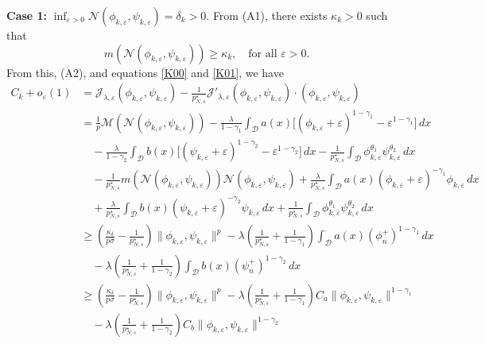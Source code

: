 \documentclass[reqno]{amsart}
\begin{document}
\noindent\textbf{Case 1:}
$\inf_{\varepsilon>0} \mathcal{N}(\phi_{k,\varepsilon},\psi_{k,\varepsilon})=\delta_k>0$.
From  (A1), there exists $\kappa_k>0$ such that
\[
m(\mathcal{N}(\phi_{k,\varepsilon},\psi_{k,\varepsilon}))\geq \kappa_k,\quad
 \text{for all } \varepsilon>0.
\]
From this, (A2), and equations \eqref{K00} and \eqref{K01}, we have
\begin{align*}
C_k+o_\varepsilon(1)
&=\mathcal{J}_{\lambda,\varepsilon}(\phi_{k,\varepsilon},\psi_{k,\varepsilon})-\frac{1}{p^\star_{N,s}}\mathcal{J}'_{\lambda,\varepsilon}(\phi_{k,\varepsilon},\psi_{k,\varepsilon})\cdot (\phi_{k,\varepsilon},\psi_{k,\varepsilon})\\
&=\frac{1}{p}\mathscr{M}(\mathcal{N}(\phi_{k,\varepsilon},\psi_{k,\varepsilon}))-\frac{\lambda}{1-\gamma_1}\int_\mathcal{D} a(x)\Big[(\phi_{k,\varepsilon}+\varepsilon)^{1-\gamma_1}-\varepsilon^{1-\gamma_1}\Big]\,dx\\
&\quad-\frac{\lambda}{1-\gamma_2}\int_\mathcal{D} b(x)\Big[(\psi_{k,\varepsilon}+\varepsilon)^{1-\gamma_2}-\varepsilon^{1-\gamma_2}\Big]\,dx-\frac{1}{p^\star_{N,s}}\int_\mathcal{D}  \phi_{k,\varepsilon}^{\theta_1}\psi_{k,\varepsilon}^{\theta_2}\,dx\\
&\quad-\frac{1}{p^\star_{N,s}}m(\mathcal{N}(\phi_{k,\varepsilon},\psi_{k,\varepsilon}))\mathcal{N}(\phi_{k,\varepsilon},\psi_{k,\varepsilon})+\frac{\lambda}{p^\star_{N,s}}\int_\mathcal{D} a(x) (\phi_{k,\varepsilon}+\varepsilon)^{-\gamma_1}\phi_{k,\varepsilon}\,dx \\
&\quad+\frac{\lambda}{p^\star_{N,s}}\int_\mathcal{D}b(x)(\psi_{k,\varepsilon}+\varepsilon)^{-\gamma_2}\psi_{k,\varepsilon}\,dx+\frac{1}{p^\star_{N,s}}\int_\mathcal{D}\phi_{k,\varepsilon}^{\theta_1}\psi_{k,\varepsilon}^{\theta_2}\,dx\\
&\geq(\frac{\kappa_\delta}{p\sigma}-\frac{1}{p^\star_{N,s}})\| \phi_{k,\varepsilon},\psi_{k,\varepsilon}\|^p-\lambda(\frac{1}{p^\star_{N,s}}+\frac{1}{1-\gamma_1})\int_\mathcal{D} a(x)(\phi_n^+)^{1-\gamma_1}\,dx\\
&\quad-\lambda(\frac{1}{p^\star_{N,s}}+\frac{1}{1-\gamma_2})\int_\mathcal{D} b(x)(\psi_n^+)^{1-\gamma_2}\,dx\\
&\geq(\frac{\kappa_\delta}{p\sigma}-\frac{1}{p^\star_{N,s}})\| \phi_{k,\varepsilon},\psi_{k,\varepsilon}\|^p-\lambda(\frac{1}{p^\star_{N,s}}+\frac{1}{1-\gamma_1})C_a \| \phi_{k,\varepsilon},\psi_{k,\varepsilon}\|^{1-\gamma_1}\\
&\quad-\lambda(\frac{1}{p^\star_{N,s}}+\frac{1}{1-\gamma_2})C_b \| 
\phi_{k,\varepsilon},\psi_{k,\varepsilon}\|^{1-\gamma_2}
\end{align*}
\end{document}
